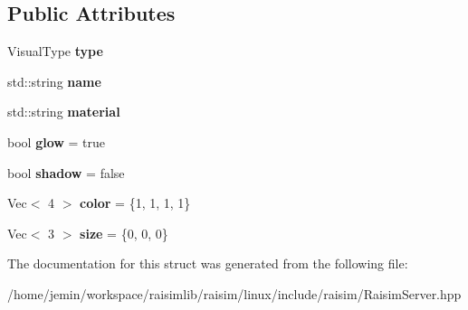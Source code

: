 \subsection*{Public Attributes}
\begin{DoxyCompactItemize}
\item 
\mbox{\label{structraisim_1_1Visuals_ae1d302c7b253803d32eb3fe03c0d9a1b}} 
Visual\+Type {\bfseries type}
\item 
\mbox{\label{structraisim_1_1Visuals_a3fa1fff84699ae84b9dbaf8cbbfc79f5}} 
std\+::string {\bfseries name}
\item 
\mbox{\label{structraisim_1_1Visuals_af7778efebfa2c9d096f0d4954ef603d0}} 
std\+::string {\bfseries material}
\item 
\mbox{\label{structraisim_1_1Visuals_a3032fa40080f8c32cea2a0b55933d1c4}} 
bool {\bfseries glow} = true
\item 
\mbox{\label{structraisim_1_1Visuals_a66e5c8ed6ea2d95ffc013f32359e4aed}} 
bool {\bfseries shadow} = false
\item 
\mbox{\label{structraisim_1_1Visuals_a05d7d36d5a1895234622f9dc8e2e9165}} 
Vec$<$ 4 $>$ {\bfseries color} = \{1, 1, 1, 1\}
\item 
\mbox{\label{structraisim_1_1Visuals_a1218ea0b97a0ec5fdb263a73e1b1e976}} 
Vec$<$ 3 $>$ {\bfseries size} = \{0, 0, 0\}
\end{DoxyCompactItemize}


The documentation for this struct was generated from the following file\+:\begin{DoxyCompactItemize}
\item 
/home/jemin/workspace/raisimlib/raisim/linux/include/raisim/Raisim\+Server.\+hpp\end{DoxyCompactItemize}
